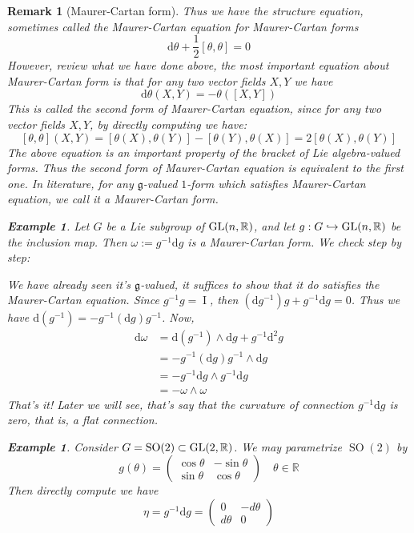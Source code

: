 \documentclass[11pt]{amsart}
\numberwithin{equation}{section}
\theoremstyle{plain}
\theoremstyle{plain}
\newtheorem{remksub}[thmsub]{Remark}
\newtheorem{exsub}[thmsub]{Example}
\numberwithin{equation}{section}
\begin{document}
\begin{remksub}[Maurer-Cartan form]
Thus we have the structure equation, sometimes called the Maurer-Cartan equation for Maurer-Cartan forms
$$
\mathrm{d}\theta+\frac12[\theta,\theta]=0
$$
However, review what we have done above, the most important equation about Maurer-Cartan form is that for any two vector fields $X,Y$ we have
$$
\mathrm{d}\theta(X,Y)=-\theta([X,Y])
$$
This is called the second form of Maurer-Cartan equation, since for any two vector fields $X,Y$, by directly computing we have:
$$
[\theta,\theta](X,Y)=[\theta(X),\theta(Y)]-[\theta(Y),\theta(X)]=2[\theta(X),\theta(Y)]
$$
The above equation is an important property of the bracket of Lie algebra-valued forms. Thus the second form of Maurer-Cartan equation is equivalent to the first one. In literature, for any $\mathfrak{g}$-valued $1$-form which satisfies Maurer-Cartan equation, we call it a Maurer-Cartan form.
\begin{exsub}\normalfont
Let $G$ be a Lie subgroup of $\operatorname{GL}(n,\Bbb{R})$, and let $g:G\hookrightarrow\operatorname{GL}(n,\Bbb{R})$ be the inclusion map. Then $\omega:=g^{-1}\mathrm{d}g$ is a Maurer-Cartan form. We check step by step:

We have already seen it's $\mathfrak{g}$-valued, it suffices to show that it do satisfies the Maurer-Cartan equation. Since $g^{-1}g=\operatorname{I}$, then $(\mathrm{d}g^{-1})g+g^{-1}\mathrm{d}g=0$. Thus we have $\mathrm{d}(g^{-1})=-g^{-1}(\mathrm{d}g)g^{-1}$. Now, 
$$
\begin{aligned}
\mathrm{d}\omega&=\mathrm{d}(g^{-1})\wedge\mathrm{d}g+g^{-1}\mathrm{d}^2g\\
&=-g^{-1}(\mathrm{d}g)g^{-1}\wedge\mathrm{d}g\\
&=-g^{-1}\mathrm{d}g\wedge g^{-1}\mathrm{d}g\\
&=-\omega\wedge\omega
\end{aligned}
$$
That's it! Later we will see, that's say that the curvature of connection $g^{-1}\mathrm{d}g$ is zero, that is, a flat connection.
\end{exsub}
\begin{exsub}\normalfont
Consider $G=\operatorname{SO}(2)\subset\operatorname{GL}(2,\Bbb{R})$. We may parametrize $\operatorname{SO}(2)$ by
$$
g(\theta)=\left(\begin{array}{cc}
\cos \theta & -\sin \theta \\
\sin \theta & \cos \theta
\end{array}\right) \quad \theta \in \mathbb{R}
$$
Then directly compute we have
$$
\eta=g^{-1}\mathrm{d}g=\left(\begin{array}{cc}
0 & -d \theta \\
d \theta & 0
\end{array}\right)
$$
\end{exsub}
\end{remksub}
\end{document}
